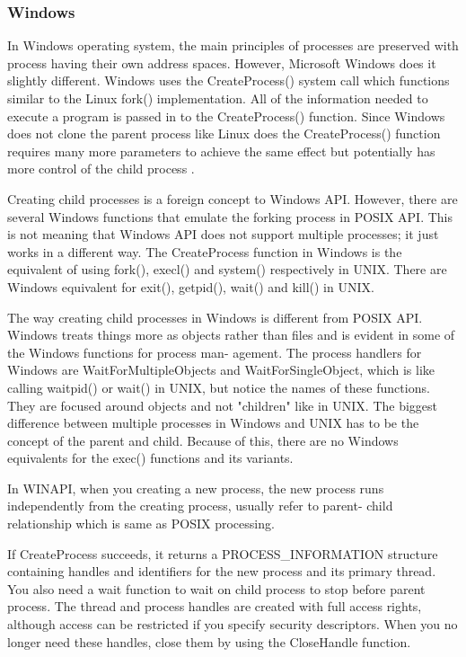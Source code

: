 \documentclass[10pt,draftclsnofoot,onecolumn,journal,compsoc]{IEEEtran}
\newcommand{\tab}{\hspace*{2em}} %
\begin{document}
\subsubsection*{Windows}
\tab In Windows operating system, the main principles of processes are preserved with process having their own address spaces. However, Microsoft Windows does it slightly different. Windows uses the CreateProcess() system call which functions similar to the Linux fork() implementation. All of the information needed to execute a program is passed in to the CreateProcess() function. Since Windows does not clone the parent process like Linux does the CreateProcess() function requires many more parameters to achieve the same effect but potentially has more control of the child process \cite{Wini}. \par
Creating child processes is a foreign concept to Windows API. However, there are several Windows functions that emulate the forking process in POSIX API. This is not meaning that Windows API does not support multiple processes; it just works in a different way. The CreateProcess function in Windows is the equivalent of using fork(), execl() and system() respectively in UNIX. There are Windows equivalent for exit(), getpid(), wait() and kill() in UNIX.\par
The way creating child processes in Windows is different from POSIX API. Windows treats things more as objects rather than files and is evident in some of the Windows functions for process man- agement. The process handlers for Windows are WaitForMultipleObjects and WaitForSingleObject, which is like calling waitpid() or wait() in UNIX, but notice the names of these functions. They are focused around objects and not "children" like in UNIX. The biggest difference between multiple processes in Windows and UNIX has to be the concept of the parent and child. Because of this, there are no Windows equivalents for the exec() functions and its variants. \par
In WINAPI, when you creating a new process, the new process runs independently from the creating process, usually refer to parent- child relationship which is same as POSIX processing.\par
If CreateProcess succeeds, it returns a PROCESS\_INFORMATION structure containing handles and identifiers for the new process and its primary thread. You also need a wait function to wait on child process to stop before parent process. The thread and process handles are created with full access rights, although access can be restricted if you specify security descriptors. When you no longer need these handles, close them by using the CloseHandle function.\par
\par
\end{document}
